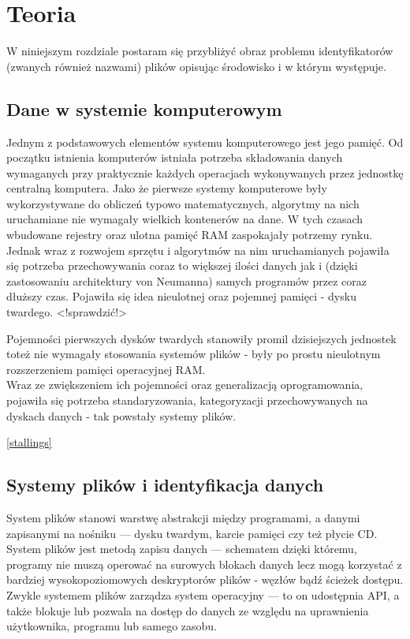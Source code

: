 \chapter{Teoria}
W niniejszym rozdziale postaram się przybliżyć obraz problemu identyfikatorów (zwanych również nazwami) plików opisując środowisko i w którym występuje.

\section{Dane w systemie komputerowym}
\par
Jednym z podstawowych elementów systemu komputerowego jest jego pamięć. Od początku istnienia komputerów istniała potrzeba składowania danych wymaganych przy praktycznie każdych operacjach wykonywanych przez jednostkę centralną komputera. Jako że pierwsze systemy komputerowe były wykorzystywane do obliczeń typowo matematycznych, algorytmy na nich uruchamiane nie wymagały wielkich kontenerów na dane. W tych czasach wbudowane rejestry oraz ulotna pamięć RAM zaspokajały potrzemy rynku. Jednak wraz z rozwojem sprzętu i algorytmów na nim uruchamianych pojawiła się potrzeba przechowywania coraz to większej ilości danych jak i (dzięki zastosowaniu architektury von Neumanna) samych programów przez coraz dłuższy czas. Pojawiła się idea nieulotnej oraz pojemnej pamięci - dysku twardego. <!sprawdzić!>

\par
Pojemności pierwszych dysków twardych stanowiły promil dzisiejszych jednostek toteż nie wymagały stosowania systemów plików - były po prostu nieulotnym rozszerzeniem pamięci operacyjnej RAM.\\
Wraz ze zwiększeniem ich pojemności oraz generalizacją oprogramowania, pojawiła się potrzeba standaryzowania, kategoryzacji przechowywanych na dyskach danych - tak powstały systemy plików.

\ref{stallings}

\section{Systemy plików i identyfikacja danych}
System plików stanowi warstwę abstrakcji między programami, a danymi zapisanymi na nośniku --- dysku twardym, karcie pamięci czy też płycie CD. System plików jest metodą zapisu danych --- schematem dzięki któremu, programy nie muszą operować na surowych blokach danych lecz mogą korzystać z bardziej wysokopoziomowych deskryptorów plików - węzłów bądź ścieżek dostępu.\\
Zwykle systemem plików zarządza system operacyjny --- to on udostępnia API, a także blokuje lub pozwala na dostęp do danych ze względu na uprawnienia użytkownika, programu lub samego zasobu.\\

